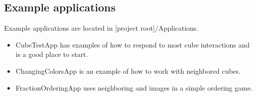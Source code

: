 \documentclass[12pt]{article}
\begin{document}
\subsection{Example applications}
Example applications are located in [project root]/Applications.

\begin{itemize}
\item CubeTestApp has examples of how to respond to most cube interactions and is a good place to start.
\item ChangingColorsApp is an example of how to work with neighbored cubes.
\item FractionOrderingApp uses neighboring and images in a simple ordering game.
\end{itemize}
\end{document}
